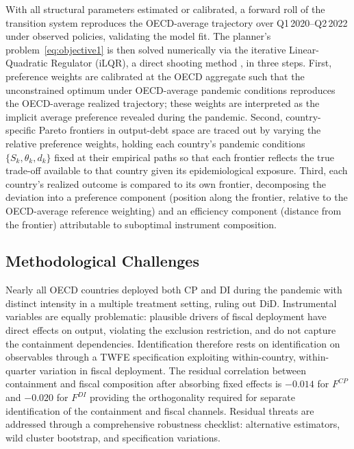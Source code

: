 \documentclass[12pt, a4paper]{article}
\begin{document}
With all structural parameters estimated or calibrated, a forward roll of the transition system reproduces the OECD-average trajectory over Q1\,2020--Q2\,2022 under observed policies, 
validating the model fit. The planner's problem~\eqref{eq:objective1} is then solved numerically via the iterative Linear-Quadratic Regulator (iLQR), a direct shooting method 
\citep{li2004iterative, bertsekas2017dynamic}, in three steps. First, preference weights are calibrated at the OECD aggregate such that the unconstrained optimum under OECD-average pandemic 
conditions reproduces the OECD-average realized trajectory; these weights are interpreted as the implicit average preference revealed during the pandemic. Second, country-specific Pareto 
frontiers in output-debt space are traced out by varying the relative preference weights, holding each country's pandemic conditions $\{S_k, \theta_k, d_k\}$ fixed at their empirical paths 
so that each frontier reflects the true trade-off available to that country given its epidemiological exposure. Third, each country's realized outcome is compared to its own frontier, 
decomposing the deviation into a preference component (position along the frontier, relative to the OECD-average reference weighting) and an efficiency component (distance from the frontier) 
attributable to suboptimal instrument composition.

\subsection{Methodological Challenges}

Nearly all OECD countries deployed both CP and DI during the pandemic with distinct intensity in a multiple treatment setting, ruling out DiD. Instrumental variables are equally problematic: 
plausible drivers of fiscal deployment have direct effects on output, violating the exclusion restriction, and do not capture the containment dependencies. Identification therefore rests on 
identification on observables through a TWFE specification exploiting within-country, within-quarter variation in fiscal deployment. The residual correlation between containment and fiscal composition after absorbing fixed effects is $-0.014$ for $F^{CP}$ and $-0.020$ for $F^{DI}$ providing the orthogonality required for separate identification of the containment and fiscal channels. Residual threats are addressed through a comprehensive robustness checklist: alternative estimators, wild cluster bootstrap, and specification variations. 
\end{document}
